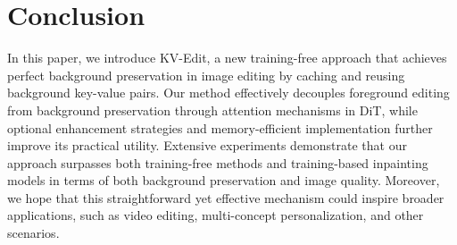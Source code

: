 \label{sec:conclusion}
\section{Conclusion}
In this paper, we introduce KV-Edit, a new training-free approach that achieves perfect background preservation in image editing by caching and reusing background key-value pairs. Our method effectively decouples foreground editing from background preservation through attention mechanisms in DiT, while optional enhancement strategies and memory-efficient implementation further improve its practical utility. Extensive experiments demonstrate that our approach surpasses both training-free methods and training-based inpainting models in terms of both background preservation and image quality. Moreover, we hope that this straightforward yet effective mechanism could inspire broader applications, such as video editing, multi-concept personalization, and other scenarios.
